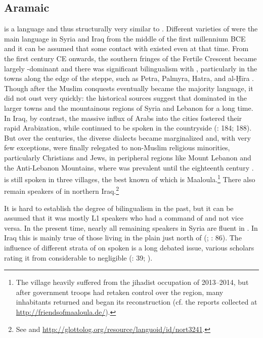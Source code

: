 \documentclass[output=paper]{langsci/langscibook}
\begin{document}
  \subsection{Aramaic} \label{aram}
 is a  language and thus structurally very similar to . Different varieties of  were the main language in Syria and Iraq from the middle of the first millennium BCE and it can be assumed that some contact with  existed even at that time. From the first century CE onwards, the southern fringes of the Fertile Crescent became largely -dominant and there was significant {bilingualism} with , particularly in the towns along the edge of the steppe, such as Petra, Palmyra, Hatra, and al-Ḥīra \citep[260--262]{Procházka2018Fertile}. Though after the Muslim conquests  eventually became the majority language, it did not oust  very quickly: the historical sources suggest that  dominated in the larger towns and the mountainous regions of Syria and Lebanon for a long time. In Iraq, by contrast, the massive influx of Arabs into the cities fostered their rapid {Arabization}, while  continued to be spoken in the countryside (\citealt{Magidow2013}: 184; 188). But over the centuries, the diverse  dialects became marginalized and, with very few exceptions, were finally relegated to non-Muslim religious minorities, particularly {Christians} and {Jews}, in peripheral regions like Mount Lebanon and the Anti-Lebanon Mountains, where  was prevalent until the eighteenth century \citep{Retsö2011}.  is still spoken in three  villages, the best known of which is Maaloula.\footnote{The village heavily suffered from the jihadist occupation of 2013--2014, but after government troops had retaken control over the region, many inhabitants returned and began its reconstruction (cf. the reports collected at \url{http://friendsofmaaloula.de/}).} There also remain speakers of  in northern Iraq.\footnote{See \citet{Coghill2012} and \url{http://glottolog.org/resource/languoid/id/nort3241}.} 

It is hard to establish the degree of {bilingualism} in the past, but it can be assumed that it was mostly  L1 speakers who had a command of  and not vice versa. In the present time, nearly all remaining  speakers in Syria are fluent in . In Iraq this is mainly true of those living in the plain just north of  (\citealt{ArnoldBehnstedt1993}; \citealt{Coghill2012}: 86). The influence of different strata of  on spoken  is a long debated issue, various scholars rating it from considerable to negligible (\citealt{Hopkins1995}: 39; \citealt{Lentin2018}).
\end{document}
